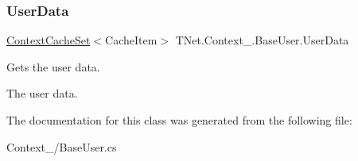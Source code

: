 \mbox{\label{class_t_net_1_1_context___1_1_base_user_a3c5485f11e33b39bacfa71807e3ddee3}} 
\subsubsection{\texorpdfstring{User\+Data}{UserData}}
{\footnotesize\ttfamily \mbox{\hyperlink{class_t_net_1_1_cache_1_1_context_cache_set}{Context\+Cache\+Set}}$<$Cache\+Item$>$ T\+Net.\+Context\+\_\+.\+Base\+User.\+User\+Data\hspace{0.3cm}{\ttfamily [get]}}



Gets the user data. 

The user data.

The documentation for this class was generated from the following file\+:\begin{DoxyCompactItemize}
\item 
Context\+\_\+/Base\+User.\+cs\end{DoxyCompactItemize}
